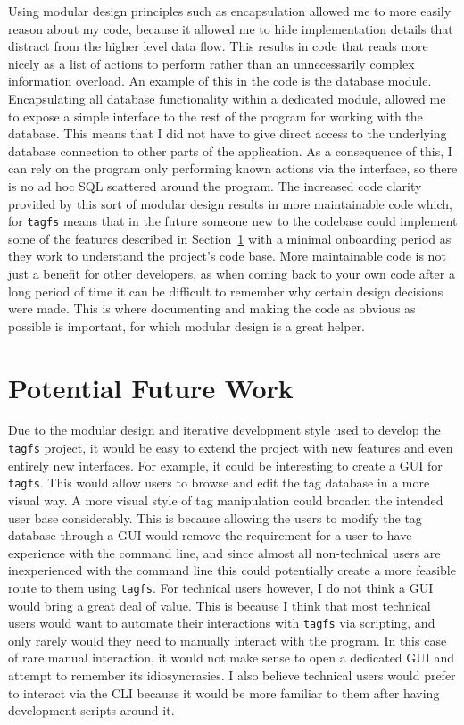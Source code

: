 Using modular design principles such as encapsulation allowed me to more easily
reason about my code, because it allowed me to hide implementation details that
distract from the higher level data flow. This results in code that reads more
nicely as a list of actions to perform rather than an unnecessarily complex
information overload. An example of this in the code is the database module.
Encapsulating all database functionality within a dedicated module, allowed me
to expose a simple interface to the rest of the program for working with the
database. This means that I did not have to give direct access to the
underlying database connection to other parts of the application. As a
consequence of this, I can rely on the program only performing known actions
via the interface, so there is no ad hoc SQL scattered around the program. The
increased code clarity provided by this sort of modular design results in more
maintainable code which, for \texttt{tagfs} means that in the future someone
new to the codebase could implement some of the features described in
Section~\ref{sec:potential-features} with a minimal onboarding period as they
work to understand the project's code base. More maintainable code is not just
a benefit for other developers, as when coming back to your own code after a
long period of time it can be difficult to remember why certain design
decisions were made. This is where documenting and making the code as obvious
as possible is important, for which modular design is a great helper.

\section{Potential Future Work}
\label{sec:potential-features}


Due to the modular design and iterative development style used to develop the
\texttt{tagfs} project, it would be easy to extend the project with new
features and even entirely new interfaces. For example, it could be interesting
to create a GUI for \texttt{tagfs}. This would allow users to browse and edit
the tag database in a more visual way. A more visual style of tag manipulation
could broaden the intended user base considerably. This is because allowing the
users to modify the tag database through a GUI would remove the requirement for
a user to have experience with the command line, and since almost all
non-technical users are inexperienced with the command line this could
potentially create a more feasible route to them using \texttt{tagfs}. For
technical users however, I do not think a GUI would bring a great deal of
value. This is because I think that most technical users would want to automate
their interactions with \texttt{tagfs} via scripting, and only rarely would
they need to manually interact with the program. In this case of rare manual
interaction, it would not make sense to open a dedicated GUI and attempt to
remember its idiosyncrasies. I also believe technical users would prefer to
interact via the CLI because it would be more familiar to them after having
development scripts around it.

